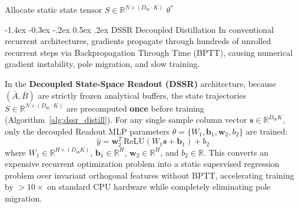 \documentclass[10pt,twocolumn,a4paper]{article}
\makeatletter
\renewcommand\subsection{\@startsection{subsection}{2}{\z@}%
  {-1.4ex \@plus -0.3ex \@minus -.2ex}%
  {0.5ex \@plus .2ex}%
  {\normalfont\normalsize\bfseries}}
\theoremstyle{plain}
\theoremstyle{definition}
\makeatother
\begin{document}
\begin{algorithm}[t]
\caption{Decoupled State-Space Readout (DSSR) Distillation}
\label{alg:dssr_distill}
Allocate static state tensor $S \in \mathbb{R}^{N \times (D_{\mathrm{in}} \cdot K)}$\;
\Return $\theta^*$\;
\end{algorithm}

\subsection{DSSR Decoupled Distillation}
In conventional recurrent architectures, gradients propagate through hundreds of unrolled recurrent steps via Backpropagation Through Time (BPTT), causing numerical gradient instability, pole migration, and slow training.

In the \textbf{Decoupled State-Space Readout (DSSR)} architecture, because $(\bar{A}, \bar{B})$ are strictly frozen analytical buffers, the state trajectories $S \in \mathbb{R}^{N \times (D_{\mathrm{in}} \cdot K)}$ are precomputed \textbf{once} before training (Algorithm~\ref{alg:dssr_distill}). For any single sample column vector $\mathbf{s} \in \mathbb{R}^{D_{\mathrm{in}} K}$, only the decoupled Readout MLP parameters $\theta = \{W_1, \mathbf{b}_1, \mathbf{w}_2, b_2\}$ are trained:
\begin{equation}
\hat{y} = \mathbf{w}_2^T \, \mathrm{ReLU}(W_1 \mathbf{s} + \mathbf{b}_1) + b_2
\end{equation}
where $W_1 \in \mathbb{R}^{H \times (D_{\mathrm{in}} K)}$, $\mathbf{b}_1 \in \mathbb{R}^H$, $\mathbf{w}_2 \in \mathbb{R}^H$, and $b_2 \in \mathbb{R}$. This converts an expensive recurrent optimization problem into a static supervised regression problem over invariant orthogonal features without BPTT, accelerating training by $>10\times$ on standard CPU hardware while completely eliminating pole migration.
\end{document}
